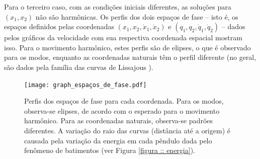 \documentclass[a4paper, 11pt]{article}
\begin{document}
    Para o terceiro caso, com as condições iniciais diferentes, as soluções para $(x_1,x_2)$ não são harmônicas. Os perfis dos dois espaços de fase -- isto é, os espaços definidos pelas coordenadas $(x_1,x_2,\dot{x}_1,\dot{x}_2)$ e $(q_1,q_2,\dot{q}_1,\dot{q}_2)$ -- dados pelos gráficos da velocidade com sua respectiva coordenada espacial mostram isso. Para o movimento harmônico, estes perfis são de elipses, o que é observado para os modos, enquanto as coordenadas naturais têm o perfil diferente (no geral, são dados pela família das curvas de Lissajous \cite{torton_marion}).

    \begin{figure}[h!]
        \centering
        \texttt{[image: graph\_espaços\_de\_fase.pdf]}
        \caption{Perfis dos espaços de fase para cada coordenada. Para os modos, observa-se elipses, de acordo com o esperado para o movimento harmônico. Para as coordenadas naturais, observa-se padrões diferentes. A variação do raio das curvas (distância até a origem) é causada pela variação da energia em cada pêndulo dada pelo fenômeno de batimentos (ver Figura \ref{figura :: energia}).
        \label{figura :: espaços de fase}}
    \end{figure}
\end{document}
